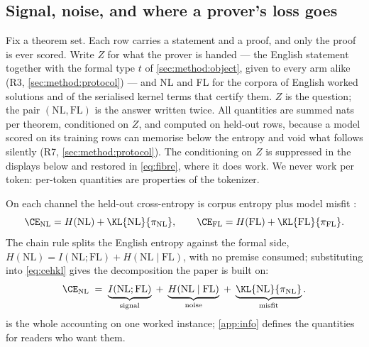 \subsection{Signal, noise, and where a prover's loss goes}
\label{sec:method:identity}

Fix a theorem set.
Each row carries a statement and a proof, and only the proof is ever scored.
Write \(Z\) for what the prover is handed --- the English statement together
with the formal type \(t\) of \cref{sec:method:object}, given to every arm alike
(R3, \cref{sec:method:protocol}) --- and NL and FL for the corpora of English
worked solutions and of the serialised kernel terms that certify them.
\(Z\) is the question;
the pair \((\mathrm{NL}, \mathrm{FL})\) is the answer written twice.
All quantities are summed nats per theorem, conditioned on \(Z\), and computed
on held-out rows, because a model scored on its training rows can memorise below
the entropy and void what follows silently (R7, \cref{sec:method:protocol}).
The conditioning on \(Z\) is suppressed in the displays below and restored in
\cref{eq:fibre}, where it does work.
We never work per token:
per-token quantities are properties of the tokenizer.

On each channel the held-out cross-entropy is corpus entropy plus model misfit
\citep{cover2006elements}:
\begin{equation}
\label{eq:cehkl}
  \CE_{\mathrm{NL}} = H(\mathrm{NL}) + \KL{\mathrm{NL}}{\pi_{\mathrm{NL}}},
  \qquad
  \CE_{\mathrm{FL}} = H(\mathrm{FL}) + \KL{\mathrm{FL}}{\pi_{\mathrm{FL}}}.
\end{equation}
The chain rule splits the English entropy against the formal side,
\(H(\mathrm{NL}) = I(\mathrm{NL};\mathrm{FL}) + H(\mathrm{NL}\mid\mathrm{FL})\),
with no premise consumed;
substituting into \cref{eq:cehkl} gives the decomposition the paper is built on:
\begin{equation}
\label{eq:identity}
  \CE_{\mathrm{NL}}
  \;=\; \underbrace{I(\mathrm{NL};\mathrm{FL})}_{\text{signal}}
  \;+\; \underbrace{H(\mathrm{NL}\mid\mathrm{FL})}_{\text{noise}}
  \;+\; \underbrace{\KL{\mathrm{NL}}{\pi_{\mathrm{NL}}}}_{\text{misfit}}.
\end{equation}
 is the whole accounting on one worked instance;
\cref{app:info} defines the quantities for readers who want them.

